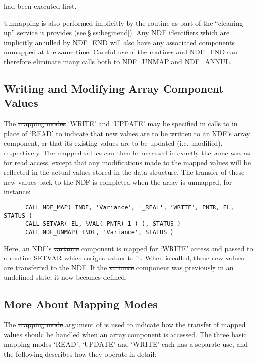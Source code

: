 had been executed first.

Unmapping is also performed implicitly by the routine  as part of
the ``cleaning-up'' service it provides (see \S\ref{ss:beginend}). 
Any NDF identifiers which are implicitly annulled by NDF\_END will also have
any associated components unmapped at the same time. 
Careful use of the routines  and NDF\_END can therefore eliminate many
calls  both to NDF\_UNMAP and NDF\_ANNUL. 

\subsection{\label{ss:writingandmodifying}Writing and Modifying Array Component Values}

The \st{mapping modes\/} `WRITE' and `UPDATE' may be specified in calls to
 in place of `READ' to indicate that new values are to be written to
an NDF's array component, or that its existing values are to be updated
(\st{i.e.}\ modified), respectively. 
The mapped values can then be accessed in exactly the same was as for read
access, except that any modifications made to the mapped values will be
reflected in the actual values stored in the data structure. 
The transfer of these new values back to the NDF is completed when the
array is unmapped, for instance:

\small
\begin{verbatim}
      CALL NDF_MAP( INDF, 'Variance', '_REAL', 'WRITE', PNTR, EL, STATUS )
      CALL SETVAR( EL, %VAL( PNTR( 1 ) ), STATUS )
      CALL NDF_UNMAP( INDF, 'Variance', STATUS )
\end{verbatim}
\normalsize

Here, an NDF's \st{variance\/} component is mapped for `WRITE' access and 
passed to a routine SETVAR which assigns values to it.
When  is called, these new values are transferred to the NDF.
If the \st{variance\/} component was previously in an undefined state, it now
becomes defined. 

\subsection{\label{ss:moreaboutmapping}More About Mapping Modes}

The \st{mapping mode\/} argument of  is used to
indicate how the transfer of mapped values should be handled when an array 
component is accessed.
The three basic mapping modes `READ', `UPDATE' and `WRITE' each has a
separate use, and the following describes how they operate in detail: 

